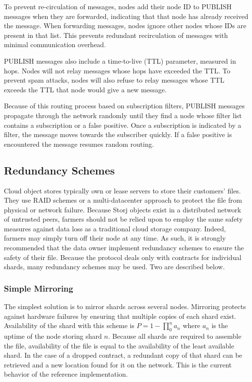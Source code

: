 \documentclass[a4paper,10pt]{article}
\begin{document}
To prevent re-circulation of messages, nodes add their node ID to PUBLISH messages when they are forwarded, indicating that that node has already received the message. When forwarding messages, nodes ignore other nodes whose IDs are present in that list. This prevents redundant recirculation of messages with minimal communication overhead.

PUBLISH messages also include a time-to-live (TTL) parameter, measured in hops. Nodes will not relay messages whose hops have exceeded the TTL. To prevent spam attacks, nodes will also refuse to relay messages whose TTL exceeds the TTL that node would give a new message.

Because of this routing process based on subscription filters, PUBLISH messages propagate through the network randomly until they find a node whose filter list contains a subscription or a false positive. Once a subscription is indicated by a filter, the message moves towards the subscriber quickly. If a false positive is encountered the message resumes random routing.

\subsection{Redundancy Schemes}
Cloud object stores typically own or lease servers to store their customers’ files. They use RAID schemes or a multi-datacenter approach to protect the file from physical or network failure. Because Storj objects exist in a distributed network of untrusted peers, farmers should not be relied upon to employ the same safety measures against data loss as a traditional cloud storage company. Indeed, farmers may simply turn off their node at any time. As such, it is strongly recommended that the data owner implement redundancy schemes to ensure the safety of their file. Because the protocol deals only with contracts for individual shards, many redundancy schemes may be used. Two are described below.

\subsubsection{Simple Mirroring}
The simplest solution is to mirror shards across several nodes. Mirroring protects against hardware failures by ensuring that multiple copies of each shard exist. Availability of the shard with this scheme is $ P = 1 - \prod_{0}^{n} a_{n} $ where $ a_{n} $ is the uptime of the node storing shard $ n $. Because all shards are required to assemble the file, availability of the file is equal to the availability of the least available shard. In the case of a dropped contract, a redundant copy of that shard can be retrieved and a new location found for it on the network. This is the current behavior of the reference implementation.
\end{document}
